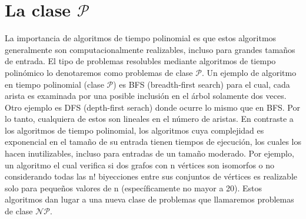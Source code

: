\documentclass{article}
\begin{document}
\section*{La clase \textit{\textbf{$\mathcal{P}$}}}
La importancia de algoritmos de tiempo polinomial es que estos algoritmos
generalmente son computacionalmente realizables, incluso para grandes
tamaños de entrada. \newline
\indent El tipo de problemas resolubles mediante algoritmos de tiempo polinómico
lo denotaremos como problemas de clase $\mathcal{P}$.\newline
\indent Un ejemplo de algoritmo en tiempo polinomial (clase \textit{$\mathcal{P}$})
es BFS (breadth-first search) para el cual, cada arista es examinada por una posible
inclusión en el árbol solamente dos veces. Otro ejemplo es DFS (depth-first serach)
donde ocurre lo mismo que en BFS. Por lo tanto, cualquiera de estos son
lineales en el número de aristas. \newline
\indent En contraste a los algoritmos de tiempo polinomial, los
algoritmos cuya complejidad es exponencial en el tamaño de su
entrada tienen tiempos de ejecución, los cuales los hacen inutilizables,
incluso para entradas de un tamaño moderado. Por ejemplo, un algoritmo
el cual verifica si dos grafos con n vértices son isomorfos o no 
considerando todas las n! biyecciones entre sus conjuntos de vértices es
realizable solo para pequeños valores de n (específicamente no mayor a 20).\newline
 \indent Estos algoritmos dan lugar a una nueva clase de problemas que llamaremos
 problemas de clase \textit{$\mathcal{N}\mathcal{P}$}.\newline

\indent
\end{document}
